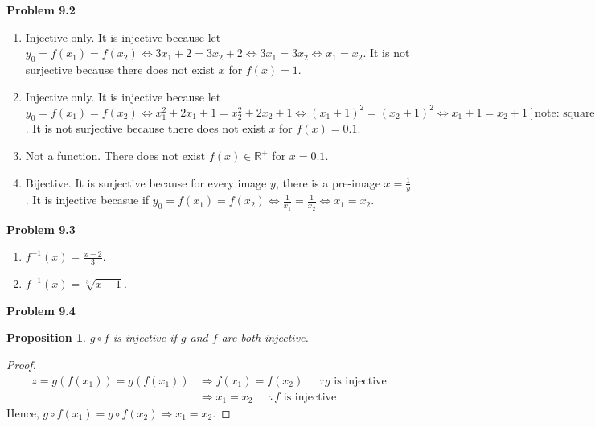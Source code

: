 \documentclass{article}
\newtheorem{prop}[thm]{Proposition}
\begin{document}
\textbf{Problem 9.2}
\begin{enumerate}[label={(\roman*)}]
    \item Injective only. It is injective because let $y_0=f(x_1)=f(x_2)\Leftrightarrow 3x_1+2=3x_2+2\Leftrightarrow3x_1=3x_2\Leftrightarrow x_1=x_2$. It is not surjective because there does not exist $x$ for $f(x) = 1$.
    \item Injective only. It is injective because let $y_0=f(x_1)=f(x_2)\Leftrightarrow x_1^2+2x_1+1=x_2^2+2x_2+1\Leftrightarrow(x_1+1)^2=(x_2+1)^2\Leftrightarrow x_1+1=x_2+1[\text{note: square root of both sides are always positive since }x>0]\Leftrightarrow x_1=x_2$. It is not surjective because there does not exist $x$ for $f(x) = 0.1$.
    \item Not a function. There does not exist $f(x) \in \mathbb{R}^+$ for $x=0.1$.
    \item Bijective. It is surjective because for every image $y$, there is a pre-image $x=\frac{1}{y}$. It is injective becasue if $y_0 =f(x_1)=f(x_2)\Leftrightarrow \frac{1}{x_1}=\frac{1}{x_2}\Leftrightarrow x_1=x_2$.
\end{enumerate}
\bigbreak

\textbf{Problem 9.3}
\begin{enumerate}[label={(\roman*)}]
    \item $f^{-1}(x)=\frac{x-2}{3}$.
    \item $f^{-1}(x)=\sqrt[3]{x-1}$.
\end{enumerate}
\bigbreak

\textbf{Problem 9.4}
\begin{prop}
    $g\circ f$ is injective if $g$ and $f$ are both injective.
\end{prop}
\begin{proof}
    \begin{align}
        z = g(f(x_1)) = g(f(x_1)) & \Rightarrow f(x_1) = f(x_2) \;\;\;\;\; \because g \text{ is injective} \\
        & \Rightarrow x_1 = x_2 \;\;\;\;\; \because f \text{ is injective}
    \end{align}
    Hence, $g\circ f(x_1)=g\circ f(x_2)\Rightarrow x_1 = x_2$.
\end{proof}
\bigbreak
\end{document}
